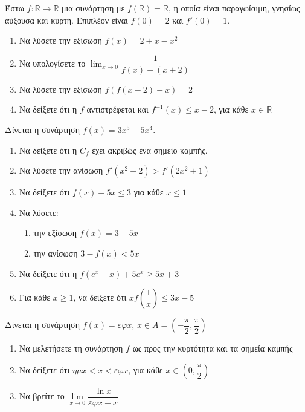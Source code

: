 \documentclass{presentation}
\begin{document}
\begin{askisi}
  Έστω $f:\mathbb{R}\to\mathbb{R}$ μια συνάρτηση με $f(\mathbb{R})=\mathbb{R}$, η οποία είναι παραγωίσιμη, γνησίως αύξουσα και κυρτή. Επιπλέον είναι $f(0)=2$ και $f'(0)=1$.
  \begin{enumerate}[<+->]
    \item Να λύσετε την εξίσωση $f(x)=2+x-x^2$
    \item Να υπολογίσετε το $\lim_{x\to 0}\dfrac{1}{f(x)-(x+2)}$
    \item Να λύσετε την εξίσωση $f\left(f(x-2)-x\right)=2$
    \item Να δείξετε ότι η $f$ αντιστρέφεται και $f^{-1}(x)\le x-2$, για κάθε $x\in \mathbb{R}$
  \end{enumerate}
\end{askisi}

\begin{askisi}
  Δίνεται η συνάρτηση $f(x)=3x^5-5x^4$.
  \begin{enumerate}[<+->]
    \item Να δείξετε ότι η $C_f$ έχει ακριβώς ένα σημείο καμπής.
    \item Να λύσετε την ανίσωση $f'(x^2+2)>f'(2x^2+1)$
    \item Να δείξετε ότι $f(x)+5x\le 3$ για κάθε $x\le 1$
    \item Να λύσετε:
          \begin{enumerate}[<+->]
            \item την εξίσωση $f(x)=3-5x$
            \item την ανίσωση $3-f(x)< 5x$
          \end{enumerate}
    \item Να δείξετε ότι η $f(e^x-x)+5e^x \ge 5x+3$
    \item Για κάθε $x\ge 1$, να δείξετε ότι $xf \left( \dfrac{1}{x} \right) \le 3x-5$
  \end{enumerate}
\end{askisi}

\begin{askisi}
  Δίνεται η συνάρτηση $f(x)=εφx$, $x\in A=\left( -\dfrac{π}{2},\dfrac{π}{2} \right)$
  \begin{enumerate}[<+->]
    \item Να μελετήσετε τη συνάρτηση $f$ ως προς την κυρτότητα και τα σημεία καμπής
    \item Να δείξετε ότι $ημx<x<εφx$, για κάθε $x\in \left( 0 , \dfrac{π}{2} \right)$
    \item Να βρείτε το $\lim\limits_{x\to 0}\dfrac{\ln x}{εφx-x}$
  \end{enumerate}
\end{askisi}
\end{document}
